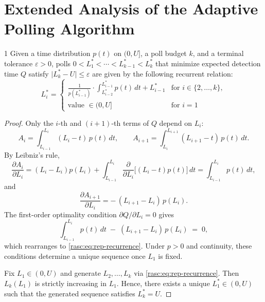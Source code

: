 \appendix

\section{Extended Analysis of the Adaptive Polling Algorithm}
\label{rasc:app:rasc-proofs}

\begin{reptheorem}{1}
Given a time distribution $p(t)$ on $(0,U]$, a poll budget $k$, and a terminal tolerance $\varepsilon>0$,
polls
$0<{L_1^{\!*}}<\cdots<L_{k-1}^{\!*}<L_k^{\!*}$
that minimize
expected detection time $Q$ satisfy $\lvert L_k^{\!*}-U\rvert\le\varepsilon$ are given by the following recurrent relation:
\[
L_i^{\!*} =
\begin{cases} 
\frac{1}{p(L_{i-1}^{\!*})} \cdot \int_{L_{i-2}^{\!*}}^{L_{i-1}^{\!*}} p(t)\, dt + L_{i-1}^{\!*} & \text{for } i \in \{2,\dots,k\}, \\
\text{value } \in (0,U] & \text{for } i=1
\end{cases} \tag{5} \label{rasc:eq:rep-recurrence}
\]
\end{reptheorem}

\begin{proof}
Only the $i$-th and $(i+1)$-th terms of $Q$ depend on $L_i$:
\[
A_i=\int_{L_{i-1}}^{L_i} (L_i-t)\,p(t)\,dt,\qquad
A_{i+1}=\int_{L_i}^{L_{i+1}} (L_{i+1}-t)\,p(t)\,dt.
\]
By Leibniz's rule,
\[
\frac{\partial A_i}{\partial L_i}
= (L_i{-}L_i)p(L_i) + \int_{L_{i-1}}^{L_i} \frac{\partial}{\partial L_i}\big[(L_i{-}t)p(t)\big]\,dt
= \int_{L_{i-1}}^{L_i} p(t)\,dt,
\]
and
\[
\frac{\partial A_{i+1}}{\partial L_i}
= -\,(L_{i+1}-L_i)\,p(L_i).
\]
The first-order optimality condition $\partial Q/\partial L_i=0$ gives
\[
\int_{L_{i-1}}^{L_i} p(t)\,dt \;-\; (L_{i+1}-L_i)\,p(L_i) \;=\;0,
\]
which rearranges to \eqref{rasc:eq:rep-recurrence}.
Under $p>0$ and continuity, these conditions determine a unique sequence once $L_1$ is fixed.

Fix $L_1\in(0,U)$ and generate $L_2,\dots,L_k$ via \eqref{rasc:eq:rep-recurrence}.
Then $L_k(L_1)$ is strictly increasing in $L_1$.
Hence, there exists a unique $L_1^*\in(0,U)$ such that the generated sequence satisfies $L_k^*=U$.
\end{proof}


